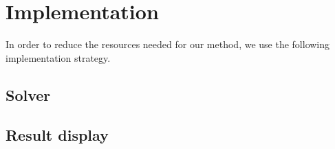 \section{Implementation}
%
In order to reduce the resources needed for our method, we use the following implementation strategy.


\subsection{Solver}


\subsection{Result display}